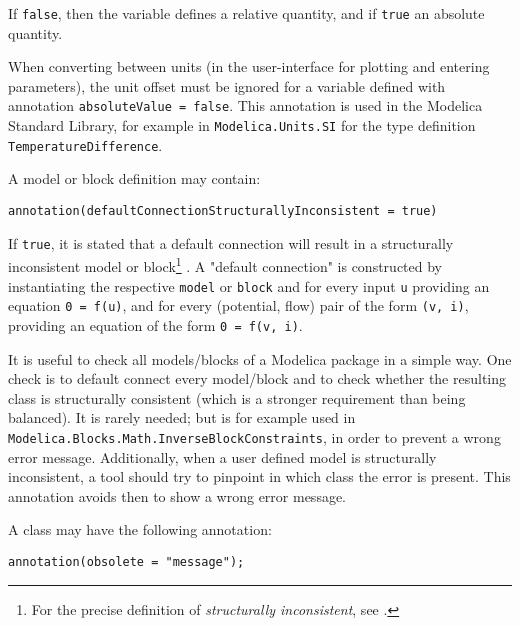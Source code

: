 If \lstinline!false!, then the variable defines a relative quantity, and if \lstinline!true! an absolute quantity.

\begin{nonnormative}
When converting between units (in the user-interface for plotting and entering parameters), the unit offset must be ignored for a variable defined with annotation \lstinline!absoluteValue = false!.
This annotation is used in the Modelica Standard Library, for example in \lstinline!Modelica.Units.SI! for the type definition \lstinline!TemperatureDifference!.
\end{nonnormative}

A model or block definition may contain:
\begin{lstlisting}[language=modelica]
annotation(defaultConnectionStructurallyInconsistent = true)
\end{lstlisting}%

If \lstinline!true!, it is stated that a default connection will result in a structurally inconsistent model or block\footnote{%
  For the precise definition of \emph{structurally inconsistent}, see \textcite{Pantelides1988ConsistentInitialization}.}%
.
A "default connection" is constructed by instantiating the respective \lstinline!model! or \lstinline!block! and for every input \lstinline!u! providing an equation \lstinline!0 = f(u)!, and for every (potential, flow) pair of the form \lstinline!(v, i)!, providing an equation of the form \lstinline!0 = f(v, i)!.

\begin{nonnormative}
It is useful to check all models/blocks of a Modelica package in a simple way.
One check is to default connect every model/block and to check whether the resulting class is structurally consistent (which is a stronger requirement than being balanced).
It is rarely needed; but is for example used in \lstinline!Modelica.Blocks.Math.InverseBlockConstraints!, in order to prevent a wrong error message.
Additionally, when a user defined model is structurally inconsistent, a tool should try to pinpoint in which class the error is present.
This annotation avoids then to show a wrong error message.
\end{nonnormative}

A class may have the following annotation:
\begin{lstlisting}[language=modelica]
annotation(obsolete = "message");
\end{lstlisting}%

